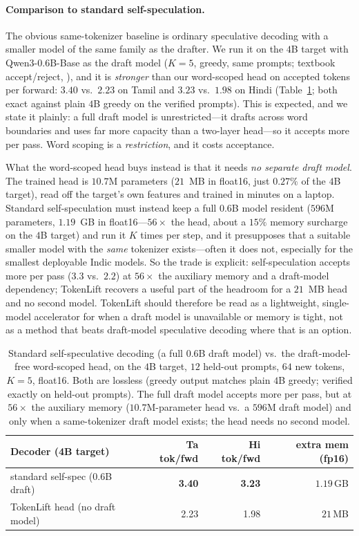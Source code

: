 \paragraph{Comparison to standard self-speculation.} The obvious same-tokenizer
baseline is ordinary speculative decoding with a smaller model of the same
family as the drafter. We run it on the $4$B target with Qwen3-0.6B-Base as the
draft model ($K{=}5$, greedy, same prompts; textbook accept/reject,
\citep{leviathan2023fast,chen2023accelerating}), and it is \emph{stronger} than
our word-scoped head on accepted tokens per forward: $3.40$ vs.\ $2.23$ on
Tamil and $3.23$ vs.\ $1.98$ on Hindi (Table~\ref{tab:selfspec}; both exact
against plain $4$B greedy on the verified prompts). This is expected, and we
state it plainly: a full draft model is unrestricted---it drafts across word
boundaries and uses far more capacity than a two-layer head---so it accepts more
per pass. Word scoping is a \emph{restriction}, and it costs acceptance.

What the word-scoped head buys instead is that it needs \emph{no separate draft
model}. The trained head is $10.7$M parameters ($21$~MB in float16, just
$0.27\%$ of the $4$B target), read off the target's own features and trained in
minutes on a laptop. Standard self-speculation must instead keep a full
$0.6$B model resident ($596$M parameters, $1.19$~GB in float16---$56\times$ the
head, about a $15\%$ memory surcharge on the $4$B target) and run it $K$ times
per step, and it presupposes that a suitable smaller model with the \emph{same}
tokenizer exists---often it does not, especially for the smallest deployable
Indic models. So the trade is explicit: self-speculation accepts more per pass
($3.3$ vs.\ $2.2$) at $56\times$ the auxiliary memory and a draft-model
dependency; TokenLift recovers a useful part of the headroom for a $21$~MB head
and no second model. TokenLift should therefore be read as a lightweight,
single-model accelerator for when a draft model is unavailable or memory is
tight, not as a method that beats draft-model speculative decoding where that is
an option.

\begin{table}[t]
\centering\small
\begin{tabular}{lrrr}
\toprule
Decoder (4B target) & Ta tok/fwd & Hi tok/fwd & extra mem (fp16) \\
\midrule
standard self-spec (0.6B draft) & \textbf{3.40} & \textbf{3.23} & $1.19$\,GB \\
TokenLift head (no draft model) & 2.23 & 1.98 & $21$\,MB \\
\bottomrule
\end{tabular}
\caption{Standard self-speculative decoding (a full 0.6B draft model) vs.\ the
draft-model-free word-scoped head, on the $4$B target, $12$ held-out prompts,
$64$ new tokens, $K{=}5$, float16. Both are lossless (greedy output matches
plain $4$B greedy; verified exactly on held-out prompts). The full draft model
accepts more per pass, but at $56\times$ the auxiliary memory ($10.7$M-parameter
head vs.\ a $596$M draft model) and only when a same-tokenizer draft model
exists; the head needs no second model.}
\label{tab:selfspec}
\end{table}

